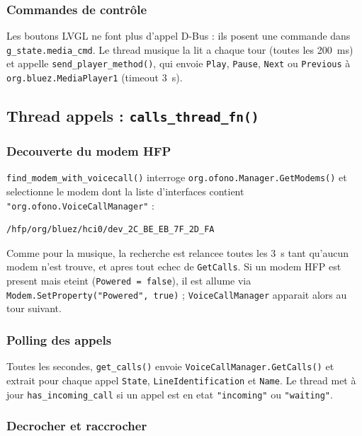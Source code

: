 \documentclass[a4paper,11pt]{article}
\begin{document}
\subsubsection{Commandes de contrôle}

Les boutons LVGL ne font plus d'appel D-Bus : ils posent une commande dans
\texttt{g\_state.media\_cmd}. Le thread musique la lit a chaque tour (toutes les 200~ms)
et appelle \texttt{send\_player\_method()}, qui envoie \texttt{Play}, \texttt{Pause},
\texttt{Next} ou \texttt{Previous} à \texttt{org.bluez.MediaPlayer1} (timeout 3~s).

\subsection{Thread appels : \texttt{calls\_thread\_fn()}}

\subsubsection{Decouverte du modem HFP}

\texttt{find\_modem\_with\_voicecall()} interroge
\texttt{org.ofono.Manager.GetModems()} et selectionne le modem dont la liste
d'interfaces contient \texttt{"org.ofono.VoiceCallManager"} :

\begin{verbatim}
/hfp/org/bluez/hci0/dev_2C_BE_EB_7F_2D_FA
\end{verbatim}

Comme pour la musique, la recherche est relancee toutes les 3~s tant qu'aucun modem
n'est trouve, et apres tout echec de \texttt{GetCalls}. Si un modem HFP est present mais
eteint (\texttt{Powered = false}), il est allume via \texttt{Modem.SetProperty("Powered", true)} ;
\texttt{VoiceCallManager} apparait alors au tour suivant.

\subsubsection{Polling des appels}

Toutes les secondes, \texttt{get\_calls()} envoie
\texttt{VoiceCallManager.GetCalls()} et extrait pour chaque appel \texttt{State},
\texttt{LineIdentification} et \texttt{Name}. Le thread met à jour
\texttt{has\_incoming\_call} si un appel est en etat \texttt{"incoming"} ou
\texttt{"waiting"}.

\subsubsection{Decrocher et raccrocher}
\end{document}
